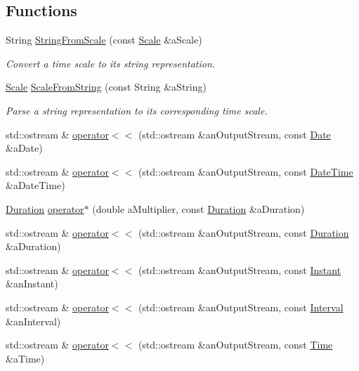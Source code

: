 \subsection*{Functions}
\begin{DoxyCompactItemize}
\item 
String \hyperlink{namespacelibrary_1_1physics_1_1time_a9e12dac6f85c8e5d30419ec136d97b16}{String\+From\+Scale} (const \hyperlink{namespacelibrary_1_1physics_1_1time_a09d2bc9fbc7b0b5f92e1419bd655e6bb}{Scale} \&a\+Scale)
\begin{DoxyCompactList}\small\item\em Convert a time scale to its string representation. \end{DoxyCompactList}\item 
\hyperlink{namespacelibrary_1_1physics_1_1time_a09d2bc9fbc7b0b5f92e1419bd655e6bb}{Scale} \hyperlink{namespacelibrary_1_1physics_1_1time_a99243c1ba273cb0ad1d7581aea8ff42a}{Scale\+From\+String} (const String \&a\+String)
\begin{DoxyCompactList}\small\item\em Parse a string representation to its corresponding time scale. \end{DoxyCompactList}\item 
std\+::ostream \& \hyperlink{namespacelibrary_1_1physics_1_1time_a6ef9fa1a257592a40e8b611a2faa6190}{operator$<$$<$} (std\+::ostream \&an\+Output\+Stream, const \hyperlink{classlibrary_1_1physics_1_1time_1_1_date}{Date} \&a\+Date)
\item 
std\+::ostream \& \hyperlink{namespacelibrary_1_1physics_1_1time_a7ad1764fdd45d77b4be0530ef93384d3}{operator$<$$<$} (std\+::ostream \&an\+Output\+Stream, const \hyperlink{classlibrary_1_1physics_1_1time_1_1_date_time}{Date\+Time} \&a\+Date\+Time)
\item 
\hyperlink{classlibrary_1_1physics_1_1time_1_1_duration}{Duration} \hyperlink{namespacelibrary_1_1physics_1_1time_a6da180b0b926ce6b8208810238d47234}{operator$\ast$} (double a\+Multiplier, const \hyperlink{classlibrary_1_1physics_1_1time_1_1_duration}{Duration} \&a\+Duration)
\item 
std\+::ostream \& \hyperlink{namespacelibrary_1_1physics_1_1time_a707806f1dd1dd8b14fb4b0d3031f55f5}{operator$<$$<$} (std\+::ostream \&an\+Output\+Stream, const \hyperlink{classlibrary_1_1physics_1_1time_1_1_duration}{Duration} \&a\+Duration)
\item 
std\+::ostream \& \hyperlink{namespacelibrary_1_1physics_1_1time_aa3f9f6615d36b192a48b9718e61a08d7}{operator$<$$<$} (std\+::ostream \&an\+Output\+Stream, const \hyperlink{classlibrary_1_1physics_1_1time_1_1_instant}{Instant} \&an\+Instant)
\item 
std\+::ostream \& \hyperlink{namespacelibrary_1_1physics_1_1time_a0148fd9fdca10f8c323ccc7abadfc298}{operator$<$$<$} (std\+::ostream \&an\+Output\+Stream, const \hyperlink{classlibrary_1_1physics_1_1time_1_1_interval}{Interval} \&an\+Interval)
\item 
std\+::ostream \& \hyperlink{namespacelibrary_1_1physics_1_1time_acc4fdcbaf44cdc22074b9b7c3e560df0}{operator$<$$<$} (std\+::ostream \&an\+Output\+Stream, const \hyperlink{classlibrary_1_1physics_1_1time_1_1_time}{Time} \&a\+Time)
\end{DoxyCompactItemize}


